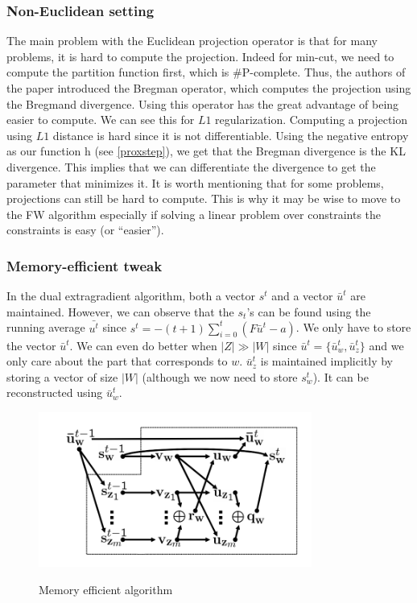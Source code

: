 \clearpage
\subsubsection{Non-Euclidean setting}
The main problem with the Euclidean projection operator is that for many
problems, it is hard to compute the projection. Indeed for min-cut, we need to
compute the partition function first, which is \#P-complete. Thus, the authors
of the paper introduced the Bregman operator, which computes the projection
using the Bregmand divergence. Using this operator has the great advantage of
being easier to compute. We can see this for $L1$ regularization. Computing a
projection using $L1$ distance is hard since it is not differentiable. Using the
negative entropy as our function h (see \ref{proxstep}), we get that the Bregman
divergence is the KL divergence. This implies that we can differentiate the
divergence to get the parameter that minimizes it. It is worth mentioning that
for some problems, projections can still be hard to compute. This is why it may
be wise to move to the FW algorithm especially if solving a linear problem over
constraints the constraints is easy (or ``easier'').

\subsubsection{Memory-efficient tweak}
In the dual extragradient algorithm, both a vector $s^t$ and a vector
$\bar{u}^t$ are maintained. However, we can observe that the $s_t$'s can be
found using the running average $\bar{u^t}$ since $s^t = -(t + 1 ) \sum_{i=0}^t
(F \bar{u}^t - a)$. We only have to store the vector $\bar{u}^t$. We can even do
better when $|{Z}| \gg |{W}|$ since $\bar{u}^t = \{ \bar{u}_w^t,\bar{u}_z^t \}$
and we only care about the part that corresponds to $w$. $\bar{u}_z^t$ is
maintained implicitly by storing a vector of size $|{W}|$ (although we now need
to store $s_w^t$). It can be reconstructed using $\bar{u}_w^t$.
\begin{figure}
  \includegraphics[width=0.8\textwidth]{figures/mem_tweak.png}
  \label{memtweak}
  \caption{Memory efficient algorithm}
\end{figure}

